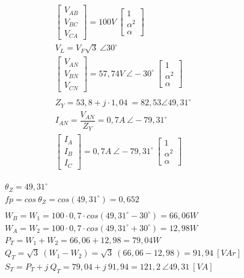 \documentclass[a4paper,12pt,oneside,openany,table,xcdraw]{article}
\begin{document}
\begin{gather*}
\begin{bmatrix}
V_{AB}\\
V_{BC}\\
V_{CA}
\end{bmatrix} =100V\ \begin{bmatrix}
1\\
\alpha ^{2}\\
\alpha 
\end{bmatrix}\\
V_{L} =V_{F}\sqrt{3} \ \angle 30^{\circ }\\
\begin{bmatrix}
V_{AN}\\
V_{BN}\\
V_{CN}
\end{bmatrix} =57,74V\ \angle -30^{\circ } \ \begin{bmatrix}
1\\
\alpha ^{2}\\
\alpha 
\end{bmatrix}\\
\\
Z_{Y} =53,8+j\cdotp 1,04\ =82,53\angle 49,31^{\circ }\\
I_{AN} =\dfrac{V_{AN}}{Z_{Y}} =0,7A\ \angle -79,31^{\circ }\\
\begin{bmatrix}
I_{A}\\
I_{B}\\
I_{C}
\end{bmatrix} =0,7A\ \angle -79,31^{\circ } \ \begin{bmatrix}
1\\
\alpha ^{2}\\
\alpha 
\end{bmatrix}
\end{gather*}

\begin{gather*}
\begin{array}{l}
\theta _{Z} =49,31^{\circ }\\
fp=cos\ \theta _{Z} =cos\left( 49,31^{\circ }\right) =0,652\\
\\
W_{B} =W_{1} =100\cdotp 0,7\cdotp cos\left( 49,31^{\circ } -30^{\circ }\right) =66,06W\\
W_{A} =W_{2} =100\cdotp 0,7\cdotp cos\left( 49,31^{\circ } +30^{\circ }\right) =12,98W\\
P_{T} =W_{1} +W_{2} =66,06+12,98=79,04W\\
Q_{T} =\sqrt{3} \ ( W_{1} -W_{2}) =\sqrt{3} \ ( 66,06-12,98) =91,94\ [VAr]\\
S_{T} =P_{T} +j\ Q_{T} =79,04+j\ 91,94=121,2\ \angle 49,31\ [VA]
\end{array}
\end{gather*}
\end{document}
